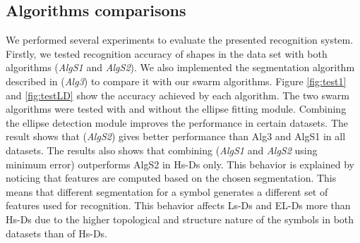 \documentclass[preprint,10pt,5p,twocolumn]{elsarticle}
\begin{document}
\subsection{Algorithms comparisons}
\label{sec:AlgExp}
We performed several experiments to evaluate the presented recognition system. Firstly, we tested recognition accuracy of shapes in the data set with both algorithms (\textsl{AlgS1} and \textsl{AlgS2}). We also implemented the segmentation algorithm described in \cite{earlyprocess} (\textsl{Alg3}) to compare it with our swarm algorithms. Figure \ref{fig:test1} and \ref{fig:testLD} show the accuracy achieved by each algorithm. The two swarm algorithms were tested with and without the ellipse fitting module. Combining the ellipse detection module improves the performance in certain datasets. The result shows that (\textsl{AlgS2}) gives better performance than Alg3 and AlgS1 in all datasets.  The results also shows that combining (\textsl{AlgS1} and \textsl{AlgS2} using minimum error) outperforms AlgS2 in Hs-Ds only. This behavior is explained by noticing that features are computed based on the chosen segmentation. This means that different segmentation for a symbol generates a different set of features used for recognition. This behavior affects Ls-Ds and EL-Ds more than Hs-Ds due to the higher topological and structure nature of the symbols in both datasets than of Hs-Ds. 
\end{document}
